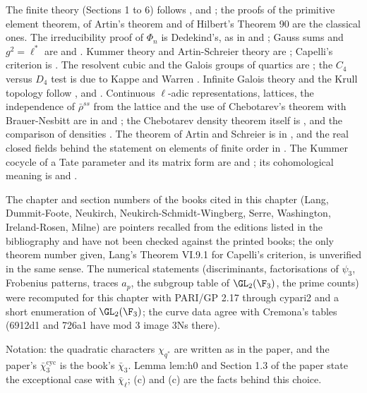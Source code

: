 The finite theory (Sections 1 to 6) follows \cite[Chapters V and VI]{Lang}, \cite[Chapters 13 and 14]{DummitFoote} and \cite{MilneFields}; the proofs of the primitive
element theorem, of Artin's theorem and of Hilbert's Theorem 90 are the classical ones. The irreducibility proof of $\Phi_n$ is Dedekind's, as in \cite[Chapter VI,
Section 3]{Lang} and \cite[Chapter 2]{Washington}; Gauss sums and $g^2=\ell^*$ are  and \cite[Chapter 6]{IrelandRosen}. Kummer theory and Artin-Schreier theory
are \cite[Chapter VI, Sections 6 and 8]{Lang}; Capelli's criterion is \cite[Chapter VI, Section 9]{Lang}. The resolvent cubic and the Galois groups of quartics are
\cite[Section 14.6]{DummitFoote}; the $C_4$ versus $D_4$ test is due to Kappe and Warren \cite{KappeWarren89}. Infinite Galois theory and the Krull topology follow
\cite[Chapter IV, Section 1]{Neukirch}, \cite[Chapter I, Section 1]{NSW} and \cite[Chapter 7]{MilneFields}. Continuous $\ell$-adic representations, lattices, the
independence of $\bar\rho^{ss}$ from the lattice and the use of Chebotarev's theorem with Brauer-Nesbitt are in \cite[Chapter I]{SerreAbelian} and \cite[Section 1]{DDT}; the
Chebotarev density theorem itself is \cite[Chapter VII, Section 13]{Neukirch}, and the comparison of densities \cite[Chapter VI, Section 4]{SerreCourse}. The theorem of
Artin and Schreier is in \cite[Chapter VI, Section 9]{Lang}, and the real closed fields behind the statement on elements of finite order in \cite[Chapter XI]{Lang}. The Kummer cocycle of a Tate parameter and its matrix form are \cite[Chapter IV]{SerreAbelian}
and ; its cohomological meaning is \cite[Chapter VI]{NSW} and .

The chapter and section numbers of the books cited in this chapter (Lang, Dummit-Foote, Neukirch, Neukirch-Schmidt-Wingberg, Serre, Washington, Ireland-Rosen,
Milne) are pointers recalled from the editions listed in the bibliography and have not been checked against the printed books; the only theorem number given,
Lang's Theorem VI.9.1 for Capelli's criterion, is unverified in the same sense. The numerical statements (discriminants, factorisations of $\psi_3$, Frobenius patterns,
traces $a_p$, the subgroup table of $\GL_2(\F_3)$, the prime counts) were recomputed for this chapter with PARI/GP 2.17 through cypari2 and a short enumeration of
$\GL_2(\F_3)$; the curve data agree with Cremona's tables (6912d1 and 726a1 have mod $3$ image 3Ns there).

Notation: the quadratic characters $\chi_{q^*}$ are written as in the paper, and the paper's $\bar\chi_3^{\mathrm{cyc}}$ is the book's $\bar\chi_3$. Lemma lem:h0 and
Section 1.3 of the paper state the exceptional case with $\bar\chi_\ell$; (c) and (c) are the facts behind this choice.
